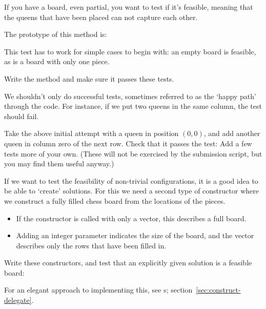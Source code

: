 If you have a board,
even partial,
you want to test if it's feasible,
meaning that the queens that have been placed can not capture each other.

The prototype of this method is:

This test has to work for simple cases to begin with:
an empty board is feasible, as is a board with only one piece.

\begin{exercise}
  Write the method and make sure it passes these tests.
\end{exercise}

We shouldn't only do successful tests,
sometimes referred to as the `happy path' through the code.
For instance,
if we put two queens in the same column, the test should fail.

\begin{exercise}
  Take the above initial attempt with a queen in position $(0,0)$,
  and add another queen in column zero of the next row.
  Check that it passes the test:
  Add a few tests more of your own.
  (These will not be exercised by the submission script,
  but you may find them useful anyway.)
\end{exercise}


If we want to test the feasibility of non-trivial configurations,
it is a good idea to be able to `create' solutions.
For this we need a second type of constructor
where we construct a fully filled chess board
from the locations of the pieces.
%
\begin{itemize}
\item If the constructor is called with only a vector, this describes a full board.
\item Adding an integer parameter indicates the size of the board,
  and the vector describes only the rows that have been filled in.
\end{itemize}

\begin{exercise}
  Write these constructors, and
  test that an explicitly given solution is a feasible board:
\end{exercise}

For an elegant approach to implementing this,
see s; section~\ref{sec:construct-delegate}.

